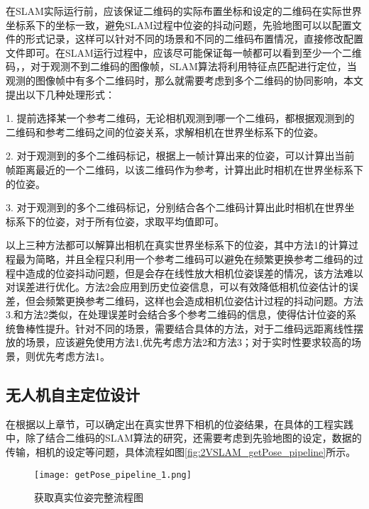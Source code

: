 在SLAM实际运行前，应该保证二维码的实际布置坐标和设定的二维码在实际世界坐标系下的坐标一致，避免SLAM过程中位姿的抖动问题，先验地图可以以配置文件的形式记录，这样可以针对不同的场景和不同的二维码布置情况，直接修改配置文件即可。在SLAM运行过程中，应该尽可能保证每一帧都可以看到至少一个二维码，，对于观测不到二维码的图像帧，SLAM算法将利用特征点匹配进行定位，当观测的图像帧中有多个二维码时，那么就需要考虑到多个二维码的协同影响，本文提出以下几种处理形式：

1. 提前选择某一个参考二维码，无论相机观测到哪一个二维码，都根据观测到的二维码和参考二维码之间的位姿关系，求解相机在世界坐标系下的位姿。

2. 对于观测到的多个二维码标记，根据上一帧计算出来的位姿，可以计算出当前帧距离最近的一个二维码，以该二维码作为参考，计算出此时相机在世界坐标系下的位姿。

3. 对于观测到的多个二维码标记，分别结合各个二维码计算出此时相机在世界坐标系下的位姿，对于所有位姿，求取平均值即可。

以上三种方法都可以解算出相机在真实世界坐标系下的位姿，其中方法1的计算过程最为简略，并且全程只利用一个参考二维码可以避免在频繁更换参考二维码的过程中造成的位姿抖动问题，但是会存在线性放大相机位姿误差的情况，该方法难以对误差进行优化。方法2会应用到历史位姿信息，可以有效降低相机位姿估计的误差，但会频繁更换参考二维码，这样也会造成相机位姿估计过程的抖动问题。方法3.和方法2类似，在处理误差时会结合多个参考二维码的信息，使得估计位姿的系统鲁棒性提升。针对不同的场景，需要结合具体的方法，对于二维码远距离线性摆放的场景，应该避免使用方法1,优先考虑方法2和方法3；对于实时性要求较高的场景，则优先考虑方法1。

\subsection{无人机自主定位设计}
\label{sec:2.4.3}
在根据以上章节，可以确定出在真实世界下相机的位姿结果，在具体的工程实践中，除了结合二维码的SLAM算法的研究，还需要考虑到先验地图的设定，数据的传输，相机的设定等问题，具体流程如图\ref{fig:2VSLAM_getPose_pipeline}所示。
\begin{figure}[t] %
  \centering
  \texttt{[image: getPose\_pipeline\_1.png]}
  \caption{获取真实位姿完整流程图}
  \label{fig:getPose_pipeline}
\end{figure}

